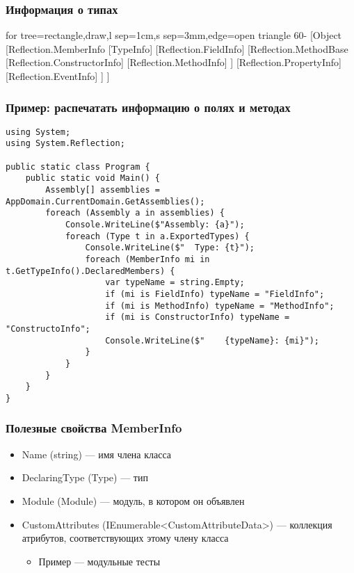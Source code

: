 \documentclass[xetex,mathserif,serif]{beamer}
\begin{document}
	\begin{frame}
		\frametitle{Информация о типах}
		\begin{center}
			\begin{tiny}
				\begin{forest}
					for tree={rectangle,draw,l sep=1cm,s sep=3mm,edge=open triangle 60-}
					[Object
						[Reflection.MemberInfo
							[TypeInfo]
							[Reflection.FieldInfo]
							[Reflection.MethodBase
								[Reflection.ConstructorInfo]
								[Reflection.MethodInfo]
							]
							[Reflection.PropertyInfo]
							[Reflection.EventInfo]
						]
					]
				\end{forest}
			\end{tiny}
		\end{center}
	\end{frame}

	\begin{frame}[fragile]
		\frametitle{Пример: распечатать информацию о полях и методах}
		\begin{scriptsize}
			\begin{verbatim}
using System;
using System.Reflection;

public static class Program {
    public static void Main() {
        Assembly[] assemblies = AppDomain.CurrentDomain.GetAssemblies();
        foreach (Assembly a in assemblies) {
            Console.WriteLine($"Assembly: {a}");
            foreach (Type t in a.ExportedTypes) {
                Console.WriteLine($"  Type: {t}");
                foreach (MemberInfo mi in t.GetTypeInfo().DeclaredMembers) {
                    var typeName = string.Empty;
                    if (mi is FieldInfo) typeName = "FieldInfo";
                    if (mi is MethodInfo) typeName = "MethodInfo";
                    if (mi is ConstructorInfo) typeName = "ConstructoInfo";
                    Console.WriteLine($"    {typeName}: {mi}");
                }
            }
        }
    }
}
			\end{verbatim}
		\end{scriptsize}
	\end{frame}

	\begin{frame}
		\frametitle{Полезные свойства MemberInfo}
		\begin{itemize}
			\item Name (string) --- имя члена класса
			\item DeclaringType (Type) --- тип
			\item Module (Module) --- модуль, в котором он объявлен
			\item CustomAttributes (IEnumerable<CustomAttributeData>) --- коллекция атрибутов, соответствующих этому члену класса
			\begin{itemize}
				\item Пример --- модульные тесты
			\end{itemize}
		\end{itemize}
	\end{frame}
\end{document}
